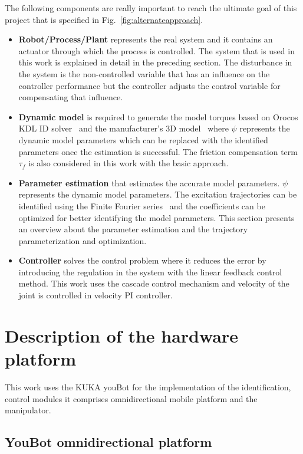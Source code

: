 The following components are really important to reach the ultimate goal of this project that is specified in Fig.~\ref{fig:alternateapproach}.

\begin{itemize}
\item \textbf{Robot/Process/Plant} represents the real system and it contains an actuator through which the process is controlled. The system that is used in this work is explained in detail in the preceding section. The disturbance in the system is the non-controlled variable that has an influence on the controller performance but the controller adjusts the control variable for compensating that influence. 
\item \textbf{Dynamic model} is required to generate the model torques based on Orocos KDL ID solver~\cite{smits2011kdl} and the manufacturer's 3D model~\cite{kukamanipulator} where $\psi$ represents the dynamic model parameters which can be replaced with the identified parameters once the estimation is successful. The friction compensation term $\tau_f$ is also considered in this work with the basic approach.
\item \textbf{Parameter estimation} that estimates the accurate model parameters. $\psi$ represents the dynamic model parameters. The excitation trajectories can be identified using the Finite Fourier series~\cite{SweversJ1997Orea} and the coefficients can be optimized for better identifying the model parameters. This section presents an overview about the parameter estimation and the trajectory parameterization and optimization.
\item \textbf{Controller} solves the control problem where it reduces the error by introducing the regulation in the system with the linear feedback control method. This work uses the cascade control mechanism and velocity of the joint is controlled in velocity PI controller. 
\end{itemize}

\newpage
\section{Description of the hardware platform}

This work uses the KUKA youBot for the implementation of the identification, control modules it comprises omnidirectional mobile platform and the manipulator. 

\subsection*{YouBot omnidirectional platform}

